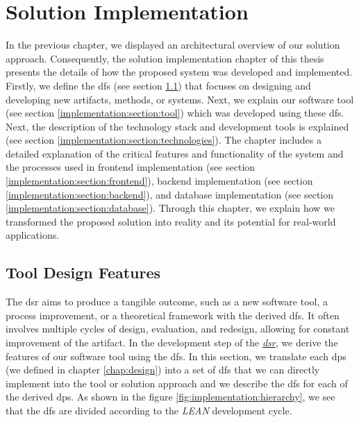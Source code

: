 
\chapter{Solution Implementation}
\label{chap:implementation}
\ifpdf
    \graphicspath{{Chapters/Implementation/Figs/}{Chapters/Implementation/Figs/}{Chapters/Implementation/Figs/}}
\else
    \graphicspath{{Chapters/Implementation/Figs/}{Chapters/Implementation/Figs/}}
\fi
In the previous chapter, we displayed an architectural overview of our solution approach.
Consequently, the solution implementation chapter of this thesis presents the details of how the proposed system was developed and implemented.
Firstly, we define the \ac{df}s (see section \ref{implementation:section:designfeatures}) that focuses on designing and developing new artifacts, methods, or systems.
Next, we explain our software tool (see section \ref{implementation:section:tool}) which was developed using these \ac{df}s.
Next, the description of the technology stack and development tools is explained (see section \ref{implementation:section:technologies}).
The chapter includes a detailed explanation of the critical features and functionality of the system and the processes used in frontend implementation (see section \ref{implementation:section:frontend}), backend implementation (see section \ref{implementation:section:backend}), and database implementation (see section \ref{implementation:section:database}).
Through this chapter, we explain how we transformed the proposed solution into reality and its potential for real-world applications.

\section{Tool Design Features}
\label{implementation:section:designfeatures}
The \ac{dsr} aims to produce a tangible outcome, such as a new software tool, a process improvement, or a theoretical framework with the derived \ac{df}s.
It often involves multiple cycles of design, evaluation, and redesign, allowing for constant improvement of the artifact.
In the development step of the \hyperref[introduction:section:research]{\textit{\ac{dsr}}}, we derive the features of our software tool using the \ac{df}s.
In this section, we translate each \ac{dp}s (we defined in chapter \ref{chap:design}) into a set of \ac{df}s that we can directly implement into the tool or solution approach and we describe the \ac{df}s for each of the derived \ac{dp}s.
As shown in the figure \ref{fig:implementation:hierarchy}, we see that the \ac{df}s are divided according to the \textit{LEAN} development cycle.
\clearpage

